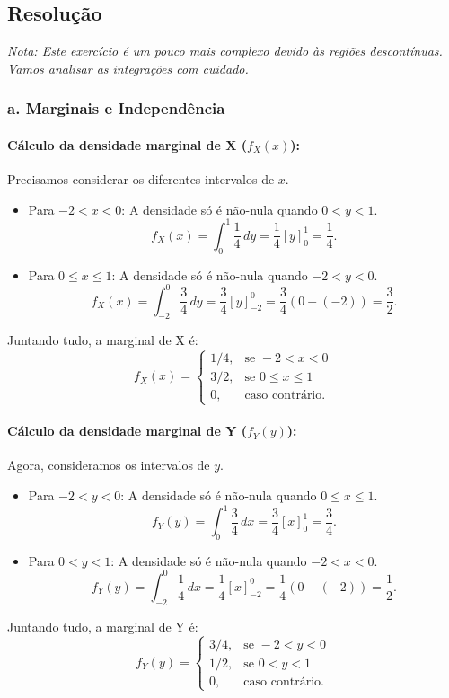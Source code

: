 \documentclass[12pt]{article}
\begin{document}
\subsection*{Resolução}
\textit{Nota: Este exercício é um pouco mais complexo devido às regiões descontínuas. Vamos analisar as integrações com cuidado.}

\subsubsection*{a. Marginais e Independência}

\paragraph{Cálculo da densidade marginal de X ($f_X(x)$):}
Precisamos considerar os diferentes intervalos de $x$.

\begin{itemize}
    \item Para $-2 < x < 0$: A densidade só é não-nula quando $0 < y < 1$.
    \[ f_X(x) = \int_{0}^{1} \frac{1}{4} \,dy = \frac{1}{4}[y]_{0}^{1} = \frac{1}{4}. \]
    \item Para $0 \le x \le 1$: A densidade só é não-nula quando $-2 < y < 0$.
    \[ f_X(x) = \int_{-2}^{0} \frac{3}{4} \,dy = \frac{3}{4}[y]_{-2}^{0} = \frac{3}{4}(0 - (-2)) = \frac{3}{2}. \]
\end{itemize}
Juntando tudo, a marginal de X é:
\[ f_X(x) = \begin{cases}
1/4, & \text{se } -2 < x < 0 \\
3/2, & \text{se } 0 \le x \le 1 \\
0, & \text{caso contrário.}
\end{cases} \]

\paragraph{Cálculo da densidade marginal de Y ($f_Y(y)$):}
Agora, consideramos os intervalos de $y$.

\begin{itemize}
    \item Para $-2 < y < 0$: A densidade só é não-nula quando $0 \le x \le 1$.
    \[ f_Y(y) = \int_{0}^{1} \frac{3}{4} \,dx = \frac{3}{4}[x]_{0}^{1} = \frac{3}{4}. \]
    \item Para $0 < y < 1$: A densidade só é não-nula quando $-2 < x < 0$.
    \[ f_Y(y) = \int_{-2}^{0} \frac{1}{4} \,dx = \frac{1}{4}[x]_{-2}^{0} = \frac{1}{4}(0 - (-2)) = \frac{1}{2}. \]
\end{itemize}
Juntando tudo, a marginal de Y é:
\[ f_Y(y) = \begin{cases}
3/4, & \text{se } -2 < y < 0 \\
1/2, & \text{se } 0 < y < 1 \\
0, & \text{caso contrário.}
\end{cases} \]
\end{document}
